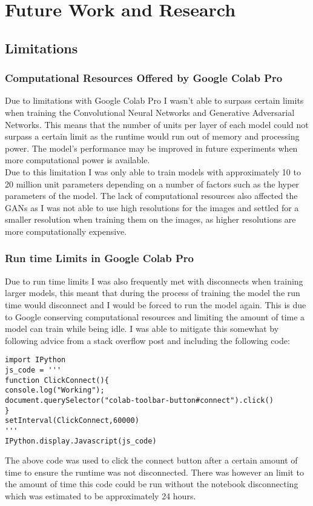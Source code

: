\chapter{Future Work and Research}
\section{Limitations}
\subsection{Computational Resources Offered by Google Colab Pro}
Due to limitations with Google Colab Pro I wasn't able to surpass certain limits when training the Convolutional Neural Networks and Generative Adversarial Networks.  This means that the number of units per layer of each model could not surpass a certain limit as the runtime would run out of memory and processing power.  The model's performance may be improved in future experiments when more computational power is available.   
\\
Due to this limitation I was only able to train models with approximately 10 to 20 million unit parameters depending on a number of factors such as the hyper parameters of the model.  The lack of computational resources also affected the GANs as I was not able to use high resolutions for the images and settled for a smaller resolution when training them on the images, as higher resolutions are more computationally expensive.
\subsection{Run time Limits in Google Colab Pro}
Due to run time limits I was also frequently met with disconnects when training larger models, this meant that during the process of training the model the run time would disconnect and I would be forced to run the model again.  This is due to Google conserving computational resources and limiting the amount of time a model can train while being idle.  I was able to mitigate this somewhat by following advice from a stack overflow post and including the following code:
\begin{verbatim}
import IPython
js_code = '''
function ClickConnect(){
console.log("Working");
document.querySelector("colab-toolbar-button#connect").click()
}
setInterval(ClickConnect,60000)
'''
IPython.display.Javascript(js_code)
\end{verbatim}
The above code was used to click the connect button after a certain amount of time to ensure the runtime was not disconnected.  There was however an limit to the amount of time this code could be run without the notebook disconnecting which was estimated to be approximately 24 hours.

